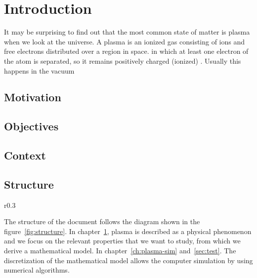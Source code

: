 \chapter{Introduction}
\label{ch:intro}

It may be surprising to find out that the most common state of matter is plasma 
when we look at the universe. A plasma is an ionized gas consisting of ions and
free electrons distributed over a region in space.
in which at least one electron 
of the atom is separated, so it remains positively charged (ionized) 
\cite{chen}.  Usually this happens in the vacuum

\section{Motivation}


\section{Objectives}

\section{Context}

\section{Structure}

\begin{wrapfigure}{r}{0.3\textwidth}
\centering
\scalebox{0.7} {
}
\caption{Principal steps in computer experiment}
\label{fig:structure}
\end{wrapfigure}

The structure of the document follows the diagram shown in the 
figure~\ref{fig:structure}. In chapter~\ref{ch:intro}, plasma is described as a 
physical phenomenon and we focus on the relevant properties that we want to 
study, from which we derive a mathematical model.  In 
chapter~\ref{ch:plasma-sim} and~\ref{sec:test}. The discretization of the 
mathematical model allows the computer simulation by using numerical algorithms.
